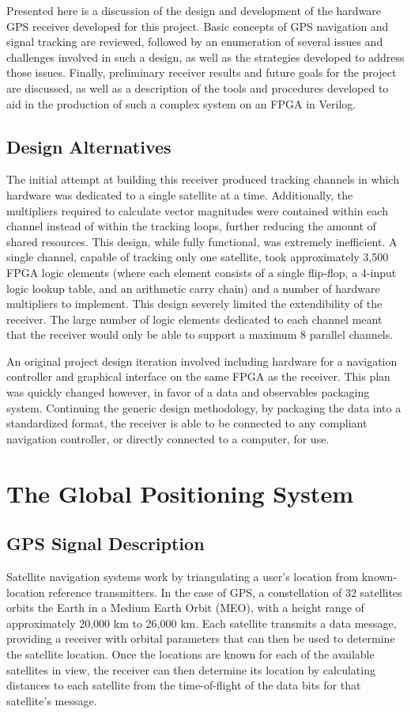 \documentclass[12pt]{article}
\begin{document}
Presented here is a discussion of the design and development of the hardware GPS receiver developed for this project. Basic concepts of GPS navigation and signal tracking are reviewed, followed by an enumeration of several issues and challenges involved in such a design, as well as the strategies developed to address those issues. Finally, preliminary receiver results and future goals for the project are discussed, as well as a description of the tools and procedures developed to aid in the production of such a complex system on an FPGA in Verilog.

\subsection{Design Alternatives}
The initial attempt at building this receiver produced tracking channels in which hardware was dedicated to a single satellite at a time. Additionally, the multipliers required to calculate vector magnitudes were contained within each channel instead of within the tracking loops, further reducing the amount of shared resources. This design, while fully functional, was extremely inefficient. A single channel, capable of tracking only one satellite, took approximately 3,500 FPGA logic elements (where each element consists of a single flip-flop, a 4-input logic lookup table, and an arithmetic carry chain) and a number of hardware multipliers to implement. This design severely limited the extendibility of the receiver. The large number of logic elements dedicated to each channel meant that the receiver would only be able to support a maximum 8 parallel channels.

An original project design iteration involved including hardware for a navigation controller and graphical interface on the same FPGA as the receiver. This plan was quickly changed however, in favor of a data and observables packaging system. Continuing the generic design methodology, by packaging the data into a standardized format, the receiver is able to be connected to any compliant navigation controller, or directly connected to a computer, for use.

\section{The Global Positioning System}

\subsection{GPS Signal Description}
\label{sec:signal description}
Satellite navigation systems work by triangulating a user's location from known-location reference transmitters. In the case of GPS, a constellation of 32 satellites orbits the Earth in a Medium Earth Orbit (MEO), with a height range of approximately 20,000 km to 26,000 km. \cite{navstar} Each satellite transmits a data message, providing a receiver with orbital parameters that can then be used to determine the satellite location. Once the locations are known for each of the available satellites in view, the receiver can then determine its location by calculating distances to each satellite from the time-of-flight of the data bits for that satellite's message.
\end{document}
